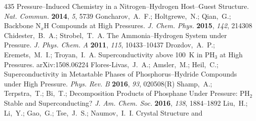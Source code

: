 \documentclass[12pt,letterpaper,oneside]{article}
\begin{document}
\begin{mcitethebibliography}{435}
  Pressure--Induced Chemistry in a Nitrogen--Hydrogen Host--Guest Structure.
  \emph{Nat. Commun.} \textbf{2014}, \emph{5}, 5739\relax
\mciteBstWouldAddEndPuncttrue
\mciteSetBstMidEndSepPunct{\mcitedefaultmidpunct}
{\mcitedefaultendpunct}{\mcitedefaultseppunct}\relax
\EndOfBibitem
{}
Goncharov,~A.~F.; Holtgrewe,~N.; Qian,~G.; 
   Backbone N$_x$H Compounds at High Pressures. \emph{J. Chem. Phys.}
  \textbf{2015}, \emph{142}, 214308\relax
\mciteBstWouldAddEndPuncttrue
\mciteSetBstMidEndSepPunct{\mcitedefaultmidpunct}
{\mcitedefaultendpunct}{\mcitedefaultseppunct}\relax
\EndOfBibitem
{}
Chidester,~B.~A.; Strobel,~T.~A. The Ammonia--Hydrogen System under Pressure.
  \emph{J. Phys. Chem. A} \textbf{2011}, \emph{115}, 10433--10437\relax
\mciteBstWouldAddEndPuncttrue
\mciteSetBstMidEndSepPunct{\mcitedefaultmidpunct}
{\mcitedefaultendpunct}{\mcitedefaultseppunct}\relax
\EndOfBibitem
{}
Drozdov,~A.~P.; Eremets,~M.~I.; Troyan,~I.~A. Superconductivity above 100~K in
  PH$_3$ at High Pressures. arXiv:1508.06224\relax
\mciteBstWouldAddEndPuncttrue
\mciteSetBstMidEndSepPunct{\mcitedefaultmidpunct}
{\mcitedefaultendpunct}{\mcitedefaultseppunct}\relax
\EndOfBibitem
{}
Flores-Livas,~J.~A.; Amsler,~M.; Heil,~C.; 
  Superconductivity in Metastable Phases of Phosphorus--Hydride Compounds under
  High Pressure. \emph{Phys. Rev. B} \textbf{2016}, \emph{93}, 020508(R)\relax
\mciteBstWouldAddEndPuncttrue
\mciteSetBstMidEndSepPunct{\mcitedefaultmidpunct}
{\mcitedefaultendpunct}{\mcitedefaultseppunct}\relax
\EndOfBibitem
{}
Shamp,~A.; Terpstra,~T.; Bi,~T.; 
  Decomposition Products of Phosphane Under Pressure: PH$_{2}$ Stable and
  Superconducting? \emph{J. Am. Chem. Soc.} \textbf{2016}, \emph{138},
  1884--1892\relax
\mciteBstWouldAddEndPuncttrue
\mciteSetBstMidEndSepPunct{\mcitedefaultmidpunct}
{\mcitedefaultendpunct}{\mcitedefaultseppunct}\relax
\EndOfBibitem
{}
Liu,~H.; Li,~Y.; Gao,~G.; Tse,~J.~S.; Naumov,~I.~I. Crystal Structure and

\end{mcitethebibliography}
\end{document}
